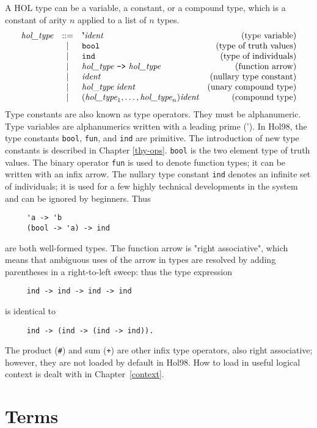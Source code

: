 \documentclass[12pt,fleqn,layout,a4paper]{report}
\newcommand{\ident}      {\mbox{\it ident}}
\newcommand{\type}       {\mbox{\it hol\_type}}
\begin{document}
 A HOL type can be a variable, a constant, or a compound type, which is a
 constant of arity $n$ applied to a list of $n$ types.
 \[
 \begin{array}{rclr}
  \type & ::= & \mbox{\bf '}\ident & \mbox{(type variable)} \\
     & | &  \verb+bool+ & \mbox{(type of truth values)} \\
     & | &  \verb+ind+ & \mbox{(type of individuals)} \\
     & | &  \type\ \verb+->+\ \type & \mbox{(function arrow)} \\
     & | &  \ident & \mbox{(nullary type constant)} \\
     & | & \type\; \ident & \mbox{(unary compound type)} \\
     & | & (\type_1,\ldots,\type_n) \ident &
 \mbox{(compound type)}
 \end{array}
 \]
 Type constants are also known as type operators. They must be
 alphanumeric. Type variables are
 alphanumerics written with a leading prime ('). In Hol98, the type
 constants {\tt bool}, {\tt fun}, and {\tt ind} are primitive. The
 introduction of new type constants is described in Chapter
 \ref{thy-ops}. {\tt bool} is the two element type of truth values. The
 binary operator {\tt fun} is used to denote function types; it can be
 written with an infix arrow. The nullary type constant {\tt ind} denotes
 an infinite set of individuals; it is used for a few highly technical
 developments in the system and can be ignored by beginners.  Thus
 \begin{verbatim}
     'a -> 'b
     (bool -> 'a) -> ind
 \end{verbatim}
 are both well-formed types. The function arrow is "right associative",
 which means that ambiguous uses of the arrow in types are resolved by
 adding parentheses in a right-to-left sweep: thus the type expression
 \begin{verbatim}
     ind -> ind -> ind -> ind
 \end{verbatim}
 is identical to
 \begin{verbatim}
     ind -> (ind -> (ind -> ind)).
 \end{verbatim}
 The product (\verb+#+) and sum (\verb!+!) are other infix type
 operators, also right associative; however, they are not loaded by
 default in Hol98. How to load in useful logical context is
 dealt with in Chapter~\ref{context}.

 \section{Terms}
\end{document}
